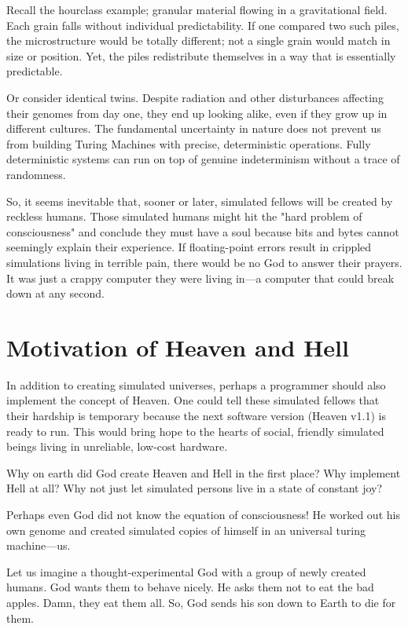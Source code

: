 Recall the hourclass example; granular material flowing in a gravitational field.
Each grain falls without individual predictability.
If one compared two such piles, the microstructure would be totally different; not a single grain would match in size or position.
Yet, the piles redistribute themselves in a way that is essentially predictable.

Or consider identical twins. Despite radiation and other disturbances affecting their genomes from day one, they end up looking alike, even if they grow up in different cultures.
The fundamental uncertainty in nature does not prevent us from building Turing Machines with precise, deterministic operations.
Fully deterministic systems can run on top of genuine indeterminism without a trace of randomness. 

So, it seems inevitable that, sooner or later, simulated fellows will be created by reckless humans.
Those simulated humans might hit the "hard problem of consciousness" and conclude they must
have a soul because bits and bytes cannot seemingly explain their experience.
If floating-point errors result in crippled simulations living in terrible pain, there would be no God to answer their prayers.
It was just a crappy computer they were living in—a computer that could break down at any second.
  

\section{Motivation of Heaven and Hell}
  
In addition to creating simulated universes, perhaps a programmer should also implement the concept of Heaven.
One could tell these simulated fellows that their hardship is temporary because the next software version (Heaven v1.1) is ready to run.
This would bring hope to the hearts of social, friendly simulated beings living in unreliable, low-cost hardware.

Why on earth did God create Heaven and Hell in the first place?
Why implement Hell at all? Why not just let simulated persons live in a state of constant joy? 

Perhaps even God did not know the equation of consciousness! He worked out his own genome and created simulated copies of himself in an universal turing machine—us.

Let us imagine a thought-experimental God with a group of newly created humans.
God wants them to behave nicely. He asks them not to eat the bad apples. Damn, they eat them all. 
So, God sends his son down to Earth to die for them.


